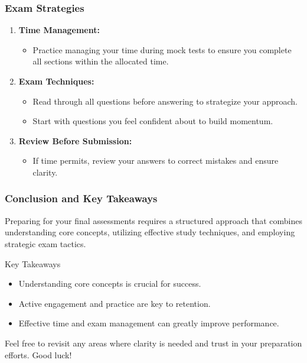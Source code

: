 \documentclass[aspectratio=169]{beamer}
\begin{document}
\begin{frame}[fragile]
    \frametitle{Exam Strategies}
    \begin{enumerate}
        \item \textbf{Time Management:}
        \begin{itemize}
            \item Practice managing your time during mock tests to ensure you complete all sections within the allocated time.
        \end{itemize}
        
        \item \textbf{Exam Techniques:}
        \begin{itemize}
            \item Read through all questions before answering to strategize your approach.
            \item Start with questions you feel confident about to build momentum.
        \end{itemize}
        
        \item \textbf{Review Before Submission:}
        \begin{itemize}
            \item If time permits, review your answers to correct mistakes and ensure clarity.
        \end{itemize}
    \end{enumerate}
\end{frame}

\begin{frame}[fragile]
    \frametitle{Conclusion and Key Takeaways}
    Preparing for your final assessments requires a structured approach that combines 
    understanding core concepts, utilizing effective study techniques, and employing strategic 
    exam tactics. 

    \begin{block}{Key Takeaways}
        \begin{itemize}
            \item Understanding core concepts is crucial for success.
            \item Active engagement and practice are key to retention.
            \item Effective time and exam management can greatly improve performance.
        \end{itemize}
    \end{block}

    Feel free to revisit any areas where clarity is needed and trust in your preparation efforts. 
    Good luck!
\end{frame}
\end{document}
